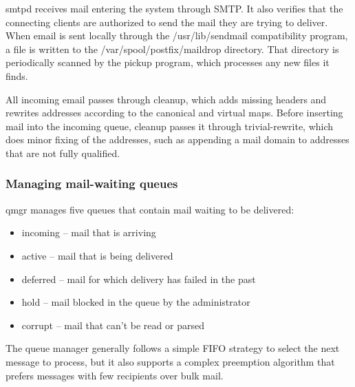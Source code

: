 \protect\hypertarget{part0026_split_058.htmlux5cux23_idIndexMarker2684}{}{}\protect\hypertarget{part0026_split_058.htmlux5cux23_idIndexMarker2685}{}{}{smtpd}
receives mail entering the system through SMTP. It also verifies that
the connecting clients are authorized to send the mail they are trying
to deliver. When email is sent locally through the {/usr/lib/sendmail}
compatibility program, a file is written to the
\protect\hypertarget{part0026_split_058.htmlux5cux23_idIndexMarker2686}{}{}{/var/spool/postfix/maildrop}
directory. That directory is periodically scanned by the
\protect\hypertarget{part0026_split_058.htmlux5cux23_idIndexMarker2687}{}{}{pickup}
program, which processes any new files it finds.

All incoming email passes through
\protect\hypertarget{part0026_split_058.htmlux5cux23_idIndexMarker2688}{}{}{cleanup},
which adds missing headers and rewrites addresses according to the
{canonical} and {virtual} maps. Before inserting mail into the
{incoming} queue, {cleanup} passes it through {trivial-rewrite}, which
does minor fixing of the addresses, such as appending a mail domain to
addresses that are not fully qualified.

\subsubsection[Managing mail-waiting
queues]{\texorpdfstring{\protect\hypertarget{part0026_split_058.htmlux5cux23_idTextAnchor1168}{}{}Managing
mail-waiting queues}{Managing mail-waiting queues}}

\protect\hypertarget{part0026_split_058.htmlux5cux23_idIndexMarker2689}{}{}\protect\hypertarget{part0026_split_058.htmlux5cux23_idIndexMarker2690}{}{}{qmgr}
manages five queues that contain mail waiting to be delivered:

\begin{itemize}
\tightlist
\item
  {incoming} -- mail that is arriving
\item
  {active} -- mail that is being delivered
\item
  {deferred} -- mail for which delivery has failed in the past
\item
  {hold} -- mail blocked in the queue by the administrator
\item
  {corrupt} -- mail that can't be read or parsed
\end{itemize}

The queue manager generally follows a simple FIFO strategy to select the
next message to process, but it also supports a complex preemption
algorithm that prefers messages with few recipients over bulk mail.

